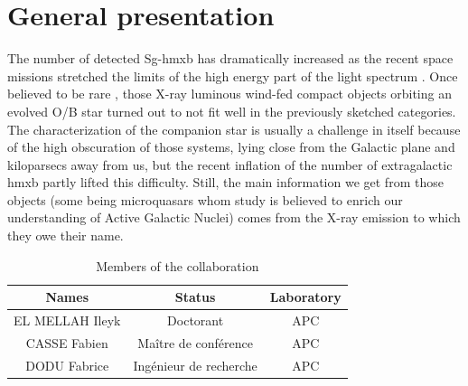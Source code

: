 \documentclass[
    a4paper, 
    12pt, onecolumn,
]{article}
\begin{document}
\newpage\section{General presentation}


\indent The number of detected Sg-{\sc hmxb} has dramatically increased as the recent space missions stretched the limits of the high energy part of the light spectrum \citep{Liu2006}. Once believed to be rare \citep{Illarionov1975}, those X-ray luminous wind-fed compact objects orbiting an evolved {\sc O}/{\sc B} star turned out to not fit well in the previously sketched categories. The characterization of the companion star is usually a challenge in itself because of the high obscuration of those systems, lying close from the Galactic plane and kiloparsecs away from us, but the recent inflation of the number of extragalactic {\sc hmxb} partly lifted this difficulty. Still, the main information we get from those objects (some being microquasars whom study is believed to enrich our understanding of Active Galactic Nuclei) comes from the X-ray emission to which they owe their name.\\
\begin{table}[h]
\centering
\begin{tabular}{||c|c|c||}
\hline\hline
Names & Status & Laboratory \\\hline
EL MELLAH Ileyk & Doctorant & APC\\ \hline 
CASSE Fabien & Ma\^itre de conf\'erence & APC \\ \hline
DODU Fabrice & Ing\'enieur de recherche &APC \\ \hline
\hline\hline
\end{tabular}
\caption{Members of the collaboration}
\end{table}
\end{document}
